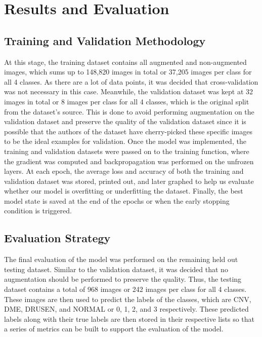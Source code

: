 \documentclass[11pt]{article}
\begin{document}
\section{Results and Evaluation}

\subsection{Training and Validation Methodology}

At this stage, the training dataset contains all augmented and non-augmented images, which sums up to 148,820 images in total or 37,205 images per class for all 4 classes. As there are a lot of data points, it was decided that cross-validation was not necessary in this case. Meanwhile, the validation dataset was kept at 32 images in total or 8 images per class for all 4 classes, which is the original split from the dataset's source. This is done to avoid performing augmentation on the validation dataset and preserve the quality of the validation dataset since it is possible that the authors of the dataset have cherry-picked these specific images to be the ideal examples for validation. Once the model was implemented, the training and validation datasets were passed on to the training function, where the gradient was computed and backpropagation was performed on the unfrozen layers. At each epoch, the average loss and accuracy of both the training and validation dataset was stored, printed out, and later graphed to help us evaluate whether our model is overfitting or underfitting the dataset. Finally, the best model state is saved at the end of the epochs or when the early stopping condition is triggered.

\subsection{Evaluation Strategy}

The final evaluation of the model was performed on the remaining held out testing dataset. Similar to the validation dataset, it was decided that no augmentation should be performed to preserve the quality. Thus, the testing dataset contains a total of 968 images or 242 images per class for all 4 classes. These images are then used to predict the labels of the classes, which are CNV, DME, DRUSEN, and NORMAL or 0, 1, 2, and 3 respectively. These predicted labels along with their true labels are then stored in their respective lists so that a series of metrics can be built to support the evaluation of the model.
\end{document}
